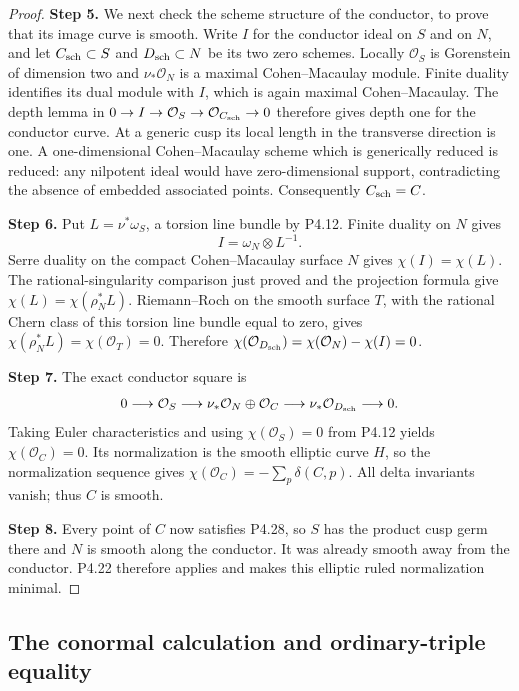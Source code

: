 \begin{proof}
\noindent\textbf{Step 5.} We next check the scheme structure
of the conductor, to prove that
its image curve is smooth.
Write $I$ for the conductor ideal
on $S$ and on $N$, and let
$C_{\rm sch}\subset S$ and
$D_{\rm sch}\subset N$ be its
two zero schemes. Locally
$\mathcal O_S$ is Gorenstein
of dimension two and
$\nu_*\mathcal O_N$ is a
maximal Cohen--Macaulay module.
Finite duality identifies
its dual module with $I$,
which is again maximal
Cohen--Macaulay. The depth
lemma in
$0\to I\to\mathcal O_S
\to\mathcal O_{C_{\rm sch}}\to0$
therefore gives depth one
for the conductor curve.
At a generic cusp its local
length in the transverse
direction is one. A
one-dimensional Cohen--Macaulay
scheme which is generically
reduced is reduced: any
nilpotent ideal would have
zero-dimensional support,
contradicting the absence of
embedded associated points.
Consequently $C_{\rm sch}=C$.

\noindent\textbf{Step 6.} Put $L=\nu^*\omega_S$, a
torsion line bundle by P4.12.
Finite duality on $N$ gives
\[
 I=\omega_N\otimes L^{-1}.
\]
Serre duality on the compact
Cohen--Macaulay surface $N$
gives $\chi(I)=\chi(L)$.
The rational-singularity
comparison just proved and
the projection formula give
$\chi(L)=\chi(\rho_N^*L)$.
Riemann--Roch on the smooth
surface $T$, with the rational
Chern class of this torsion
line bundle equal to zero,
gives $\chi(\rho_N^*L)
=\chi(\mathcal O_T)=0$.
Therefore
$\chi(\mathcal O_{D_{\rm sch}})
=\chi(\mathcal O_N)-\chi(I)=0$.

\noindent\textbf{Step 7.} The exact conductor square is
\[
 0\longrightarrow\mathcal O_S
 \longrightarrow
 \nu_*\mathcal O_N\oplus\mathcal O_C
 \longrightarrow\nu_*\mathcal O_{D_{\rm sch}}
 \longrightarrow0.
\]
Taking Euler characteristics and
using $\chi(\mathcal O_S)=0$
from P4.12 yields
$\chi(\mathcal O_C)=0$.
Its normalization is the
smooth elliptic curve $H$,
so the normalization sequence
gives $\chi(\mathcal O_C)
 =-\sum_p\delta(C,p)$.
All delta invariants vanish;
thus $C$ is smooth.

\noindent\textbf{Step 8.} Every point of $C$ now satisfies
P4.28, so $S$ has the product
cusp germ there and $N$ is
smooth along the conductor.
It was already smooth away
from the conductor. P4.22
therefore applies and makes
this elliptic ruled
normalization minimal.
\end{proof}


\subsection{The conormal calculation and ordinary-triple equality}

